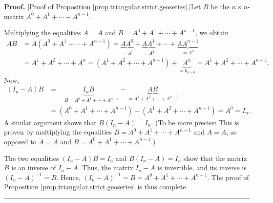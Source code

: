 \documentclass[numbers=enddot,12pt,final,onecolumn,notitlepage]{scrartcl}%
\theoremstyle{definition}
\newenvironment{proof}[1][Proof]{\noindent\textbf{#1.} }{\ \rule{0.5em}{0.5em}}
\begin{document}
\begin{proof}
[Proof of Proposition \ref{prop.triangular.strict.geoseries}.]Let $B$ be the
$n\times n$-matrix $A^{0}+A^{1}+\cdots+A^{n-1}$.

Multiplying the equalities $A=A$ and $B=A^{0}+A^{1}+\cdots+A^{n-1}$, we obtain%
\begin{align*}
AB  &  =A\left(  A^{0}+A^{1}+\cdots+A^{n-1}\right)  =\underbrace{AA^{0}%
}_{=A^{1}}+\underbrace{AA^{1}}_{=A^{2}}+\cdots+\underbrace{AA^{n-1}}_{=A^{n}%
}\\
&  =A^{1}+A^{2}+\cdots+A^{n}=\left(  A^{1}+A^{2}+\cdots+A^{n-1}\right)
+\underbrace{A^{n}}_{=0_{n\times n}}=A^{1}+A^{2}+\cdots+A^{n-1}.
\end{align*}
Now,%
\begin{align*}
\left(  I_{n}-A\right)  B  &  =\underbrace{I_{n}B}_{=B=A^{0}+A^{1}%
+\cdots+A^{n-1}}-\underbrace{AB}_{=A^{1}+A^{2}+\cdots+A^{n-1}}\\
&  =\left(  A^{0}+A^{1}+\cdots+A^{n-1}\right)  -\left(  A^{1}+A^{2}%
+\cdots+A^{n-1}\right)  =A^{0}=I_{n}.
\end{align*}
A similar argument shows that $B\left(  I_{n}-A\right)  =I_{n}$. (To be more
precise: This is proven by multiplying the equalities $B=A^{0}+A^{1}%
+\cdots+A^{n-1}$ and $A=A$, as opposed to $A=A$ and $B=A^{0}+A^{1}%
+\cdots+A^{n-1}$.)

The two equalities $\left(  I_{n}-A\right)  B=I_{n}$ and $B\left(
I_{n}-A\right)  =I_{n}$ show that the matrix $B$ is an inverse of $I_{n}-A$.
Thus, the matrix $I_{n}-A$ is invertible, and its inverse is $\left(
I_{n}-A\right)  ^{-1}=B$. Hence, $\left(  I_{n}-A\right)  ^{-1}=B=A^{0}%
+A^{1}+\cdots+A^{n-1}$. The proof of Proposition
\ref{prop.triangular.strict.geoseries} is thus complete.
\end{proof}
\end{document}
